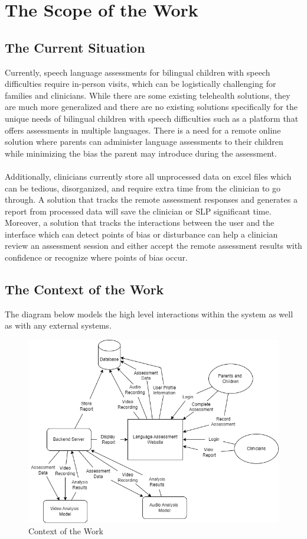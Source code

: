 \documentclass[12pt]{article}
\begin{document}
\section{The Scope of the Work}
\subsection{The Current Situation}
\hspace{1.5em}Currently, speech language assessments for bilingual children with speech difficulties require in-person visits, which can be logistically challenging 
for families and clinicians. While there are some existing telehealth solutions, they are much more generalized and there are no existing solutions 
specifically for the unique needs of bilingual children with speech difficulties such as a platform that offers assessments in multiple languages. 
There is a need for a remote online solution where parents can administer language assessments to their children while minimizing the bias the parent 
may introduce during the assessment. \\\\
\indent Additionally, clinicians currently store all unprocessed data on excel files which can be tedious, disorganized, and require extra time from the clinician 
to go through. A solution that tracks the remote assessment responses and generates a report from processed data will save the clinician or SLP significant 
time. Moreover, a solution that tracks the interactions between the user and the interface which can detect points of bias or disturbance can help a clinician 
review an assessment session and either accept the remote assessment results with confidence or recognize where points of bias occur.

\subsection{The Context of the Work}
\hspace{1.5em}The diagram below models the high level interactions within the system as well as with any external systems.
\begin{figure}[H]
  \centering
  \includegraphics[scale=0.5]{images/ContextoftheWork.png}
  \caption{Context of the Work}
\end{figure}
\end{document}

